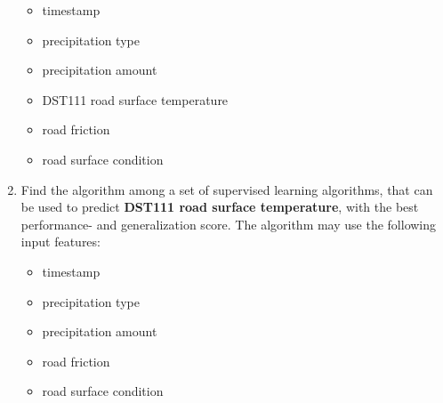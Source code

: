 \begin{enumerate}
\begin{itemize}
				\item timestamp
				\item precipitation type
				\item precipitation amount
				\item DST111 road surface temperature
				\item road friction
				\item road surface condition
			\end{itemize}
		\item Find the algorithm among a set of supervised learning algorithms, that can be used to predict \textbf{DST111 road surface temperature}, with the best performance- and generalization score. The algorithm may use the following input features: 
			\begin{itemize}
				\item timestamp
				\item precipitation type
				\item precipitation amount
				\item road friction
				\item road surface condition
			\end{itemize}
	\end{enumerate}

